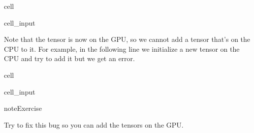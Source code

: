 \documentclass[letterpaper,10pt,english]{jupyterBook}
\begin{document}
\begin{sphinxuseclass}{cell}\begin{sphinxVerbatimInput}

\begin{sphinxuseclass}{cell_input}
\begin{sphinxVerbatim}[commandchars=\\\{\}]
 
      
      

      
 
\end{sphinxVerbatim}

\end{sphinxuseclass}\end{sphinxVerbatimInput}

\end{sphinxuseclass}
\sphinxAtStartPar
Note that the tensor is now on the GPU, so we cannot add a tensor that’s on the CPU to it. For example, in the following line we initialize a new tensor on the CPU and try to add it but we get an error.

\begin{sphinxuseclass}{cell}\begin{sphinxVerbatimInput}

\begin{sphinxuseclass}{cell_input}
\begin{sphinxVerbatim}[commandchars=\\\{\}]
    \PYG{p}{[}  \PYG{p}{]}
\end{sphinxVerbatim}

\end{sphinxuseclass}\end{sphinxVerbatimInput}

\end{sphinxuseclass}
\begin{sphinxadmonition}{note}{Exercise}

\sphinxAtStartPar
Try to fix this bug so you can add the tensors on the GPU.
\end{sphinxadmonition}
\end{document}
